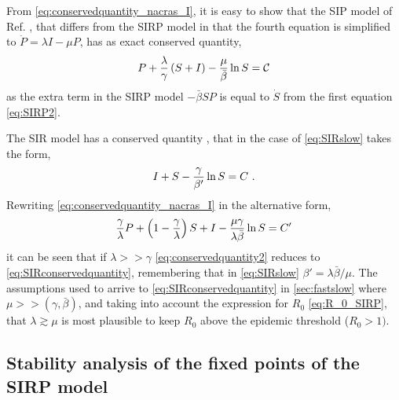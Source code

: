 From \cref{eq:conservedquantity_nacras_I}, it is easy to show that the SIP model
of Ref. \cite{article_SIP}, that differs from the SIRP model in that the
fourth equation is simplified to $\dot{P}=\lambda I-\mu P$, has as
exact conserved quantity,
\begin{equation}
    P + \frac{\lambda}{\gamma}\left(S+I\right)-\frac{\mu}{\bar{\beta}}\ln
    S={\mathcal C}
    \label{eq:conservedquantitySIP}
\end{equation}
as the extra term in the SIRP model $-\bar{\beta}SP$ is equal to $\dot{S}$
from the first equation \cref{eq:SIRP2}.

The SIR model has a conserved quantity \cite{Murray_book}, that in the case
of
\cref{eq:SIRslow} takes the form,
\begin{equation}
    I+S-{{\gamma}\over{\beta'}} \ln S =C\ .
    \label{eq:SIRconservedquantity}
\end{equation}
Rewriting \cref{eq:conservedquantity_nacras_I} in the alternative form,
\begin{equation}
    {{\gamma}\over{\lambda}} P +\left(1-{{\gamma}\over{\lambda}}\right) S + I
    -{{\mu\gamma}\over{\lambda\bar{\beta}}} \ln S=C'
    \label{eq:conservedquantity2}
\end{equation}
it can be seen that if $\lambda>>\gamma$ \cref{eq:conservedquantity2} reduces
to
\cref{eq:SIRconservedquantity}, remembering that in \cref{eq:SIRslow}
$\beta'=\lambda\bar{\beta}/\mu$. The assumptions used to arrive to
\cref{eq:SIRconservedquantity} in \cref{sec:fastslow} where
$\mu>>(\gamma,\bar{\beta})$, and taking into account the expression for $R_0$
\cref{eq:R_0_SIRP}, that $\lambda\gtrsim\mu$ is most plausible to keep $R_0$
above the epidemic threshold ($R_0>1)$.

\subsection{Stability analysis of the fixed points of the SIRP model}
\label{app:linstabfp}

